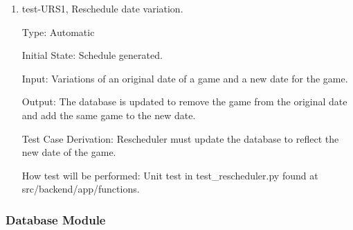 \documentclass[12pt, titlepage]{article}
\begin{document}
\begin{enumerate}

\item{test-URS1, Reschedule date variation.\\}

Type: Automatic

Initial State: Schedule generated.

Input: Variations of an original date of a game and a new date for the game.

Output: The database is updated to remove the game from the original date and
add the same game to the new date.

Test Case Derivation: Rescheduler must update the database to reflect the new
date of the game.

How test will be performed: Unit test in test\_rescheduler.py found at
src/backend/app/functions.

\end{enumerate}

\subsubsection{Database Module}

\end{document}
